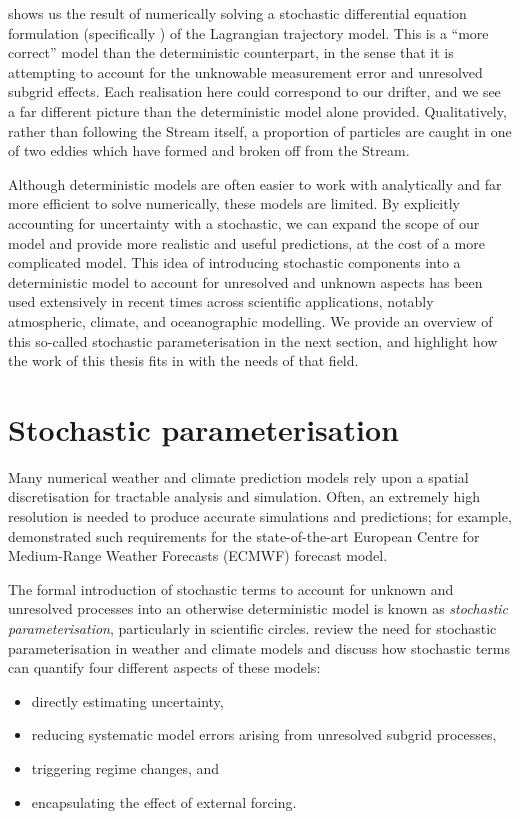  shows us the result of numerically solving a stochastic differential equation formulation (specifically ) of the Lagrangian trajectory model.
This is a ``more correct'' model than the deterministic counterpart, in the sense that it is attempting to account for the unknowable measurement error and unresolved subgrid effects.
Each realisation here could correspond to our drifter, and we see a far different picture than the deterministic model alone provided.
Qualitatively, rather than following the Stream itself, a proportion of particles are caught in one of two eddies which have formed and broken off from the Stream.



Although deterministic models are often easier to work with analytically and far more efficient to solve numerically, these models are limited.
By explicitly accounting for uncertainty with a stochastic, we can expand the scope of our model and provide more realistic and useful predictions, at the cost of a more complicated model.
This idea of introducing stochastic components into a deterministic model to account for unresolved and unknown aspects has been used extensively in recent times across scientific applications, notably atmospheric, climate, and oceanographic modelling.
We provide an overview of this so-called stochastic parameterisation in the next section, and highlight how the work of this thesis fits in with the needs of that field.






\section{Stochastic parameterisation}

Many numerical weather and climate prediction models rely upon a spatial discretisation for tractable analysis and simulation.
Often, an extremely high resolution is needed to produce accurate simulations and predictions; for example, \citet{DawsonEtAl_2012_SimulatingRegimeStructures} demonstrated such requirements for the state-of-the-art European Centre for Medium-Range Weather Forecasts (ECMWF) forecast model.

The formal introduction of stochastic terms to account for unknown and unresolved processes into an otherwise deterministic model is known as \emph{stochastic parameterisation}, particularly in scientific circles.
\citet{BernerEtAl_2017_StochasticParameterizationNew} review the need for stochastic parameterisation in weather and climate models and discuss how stochastic terms can quantify four different aspects of these models:
\begin{itemize}
	\item directly estimating uncertainty,
	\item reducing systematic model errors arising from unresolved subgrid processes,
	\item triggering regime changes, and
	\item encapsulating the effect of external forcing.
\end{itemize}


